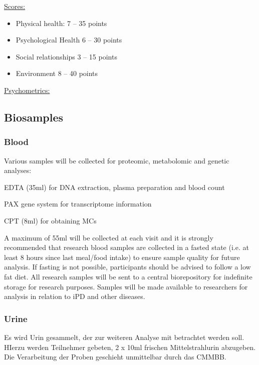 \underline{Scores:}
\begin{itemize}\itemsep2pt
\item Physical health: 7 -- 35 points
\item Psychological Health 6 -- 30 points
\item Social relationships 3 -- 15 points %
\item Environment 8 – 40 points
\end{itemize}

\underline{Psychometrics:}

\subsection{Biosamples}
\label{subsec:biosamples}


\subsubsection{Blood}
\label{biosamples:blood}
Various samples will be collected for proteomic, metabolomic and genetic analyses:
\begin{item}
\item EDTA (35ml) for DNA extraction, plasma preparation and blood count
\item PAX gene system for transcriptome information
\item CPT (8ml) for obtaining MCs
\end{item}
A maximum of 55ml will be collected at each visit and it is strongly recommended that research blood samples are collected in a fasted state (i.e. at least 8 hours since last meal/food intake) to ensure sample quality for future analysis. If fasting is not possible, participants should be advised to follow a low fat diet. All research samples will be sent to a central biorepository for indefinite storage for research purposes. Samples will be made available to researchers for analysis in relation to \ac{iPD} and other diseases.

\subsubsection{Urine}
\label{biosamples:urine}
Es wird Urin gesammelt, der zur weiteren Analyse mit betrachtet werden soll. HIerzu werden Teilnehmer gebeten, 2 x 10ml frischen Mittelstrahlurin abzugeben. Die Verarbeitung der Proben geschieht unmittelbar durch das CMMBB.

